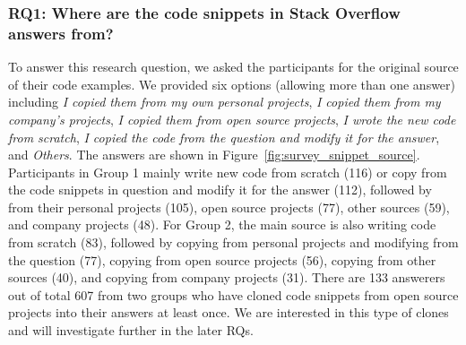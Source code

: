 \documentclass{svjour3}                     %
\begin{document}
\subsubsection*{RQ1: Where are the code snippets in Stack Overflow answers from?} 

To answer this research question, we asked the participants for the original
source of their code examples. We provided six options (allowing more than one
answer) including \textit{I copied them from my own personal projects},
\textit{I copied them from my company's projects}, \textit{I copied them from
	open source projects}, \textit{I wrote the new code from scratch}, \textit{I
	copied the code from the question and modify it for the answer}, and
\textit{Others}. The answers are shown in
Figure~\ref{fig:survey_snippet_source}. Participants in Group 1 mainly write new
code from scratch (116) or copy from the code snippets in question and modify it
for the answer (112), followed by from their personal projects (105), open
source projects (77), other sources (59), and company projects (48). For Group
2, the main source is also writing code from scratch (83), followed by copying
from personal projects and modifying from the question (77), copying from open
source projects (56), copying from other sources (40), and copying from company
projects (31). There are 133 answerers out of total 607 from two groups who have cloned
code snippets from open source projects into their answers at least once. We are interested
in this type of clones and will investigate further in the later RQs.
\end{document}
